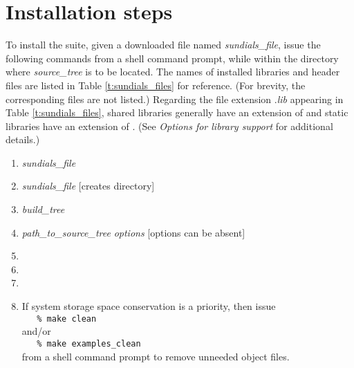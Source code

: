 \section{Installation steps}\label{ss:install_steps}

To install the {\sundials} suite, given a downloaded file named
{\em sundials\_file}, issue the following commands from
a shell command prompt, while within the directory where {\em source\_tree}
is to be located.  The names of installed libraries and header files
are listed in Table \ref{t:sundials_files} for reference.  (For brevity,
the corresponding  files are not listed.)  Regarding the file
extension .{\em lib} appearing in Table \ref{t:sundials_files}, shared libraries
generally have an extension of  and static libraries have an extension of
.  (See {\em Options for library support} for additional details.)
\begin{enumerate}
\item {} {\em sundials\_file}
\item {} {\em sundials\_file}\hspace{2em} [creates  directory]
\item {} {\em build\_tree}
\item {\em path\_to\_source\_tree} {\em options}\hspace{2em} [options can be absent]
\item {}
\item {}
\item {}
\item If system storage space conservation is a priority, then issue \\
\verb+   % make clean+ \\
and/or \\
\verb+   % make examples_clean+ \\
from a shell command prompt to remove unneeded object files.
\end{enumerate}

